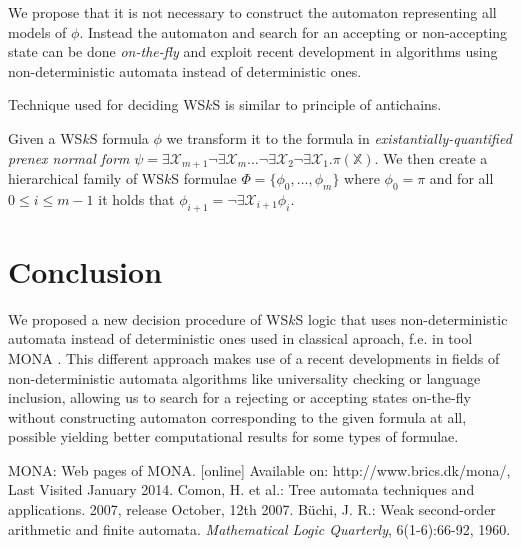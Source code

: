 \documentclass{eeict}
\begin{document}
We propose that it is not necessary to construct the automaton representing all
models of $\phi$. Instead the automaton and search for an accepting or
non-accepting state can be done \emph{on-the-fly} and exploit recent development
in algorithms using non-deterministic automata instead of deterministic ones. 

Technique used for deciding WS$k$S is similar to principle of antichains.

Given a WS$k$S formula $\phi$ we transform it to the formula in 
\emph{existantially-quantified prenex normal form} $\psi =
\exists\mathcal{X}_{m+1}\neg\exists\mathcal{X}_m\ldots\neg\exists\mathcal{X}_2\neg\exists\mathcal{X}_1.\pi(\mathds{X})$.
We then create a hierarchical family of WS$k$S formulae $\Phi =
\{\phi_0,\ldots,\phi_m\}$ where $\phi_0 = \pi$ and for all $0 \leq i \leq m-1$
it holds that $\phi_{i+1} = \neg\exists\mathcal{X}_{i+1}\phi_i$. 

\section{Conclusion}

We proposed a new decision procedure of WS$k$S logic that uses non-deterministic
automata instead of deterministic ones used in classical aproach, f.e. in tool
MONA \cite{mona}. This different approach makes use of a recent developments in
fields of non-deterministic automata algorithms like universality checking or
language inclusion, allowing us to search for a rejecting or accepting states
on-the-fly without constructing automaton corresponding to the given formula at
all, possible yielding better computational results for some types of formulae.

\begin{thebibliography}{9}
   MONA: Web pages of MONA. [online] Available on:
  http://www.brics.dk/mona/, Last Visited January 2014.
  Comon, H. et al.: Tree automata techniques and applications.
  2007, release October, 12th 2007.
  Büchi, J. R.: Weak second-order arithmetic and finite automata.
  \emph{Mathematical Logic Quarterly}, 6(1-6):66-92, 1960.
\end{thebibliography}
\end{document}
